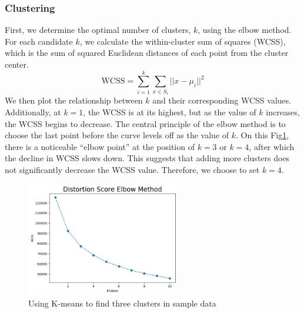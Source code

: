 \documentclass{article}
\begin{document}
\subsubsection{Clustering}
First, we determine the optimal number of clusters, \( k \), using the elbow method. For each candidate \( k \), we calculate the within-cluster sum of squares (WCSS), which is the sum of squared Euclidean distances of each point from the cluster center.
\begin{equation}
\text{WCSS} = \sum_{i=1}^{k} \sum_{x \in S_i} ||x - \mu_i||^2
\end{equation}
We then plot the relationship between \( k \) and their corresponding WCSS values. Additionally, at \( k = 1 \), the WCSS is at its highest, but as the value of \( k \) increases, the WCSS begins to decrease. The central principle of the elbow method is to choose the last point before the curve levels off as the value of \( k \). On this Fig\ref{fig:Elbow methods to find K}, there is a noticeable “elbow point” at the position of \( k = 3 \) or \( k = 4 \), after which the decline in WCSS slows down. This suggests that adding more clusters does not significantly decrease the WCSS value. Therefore, we choose to set \( k = 4 \).
\begin{figure}[hbt!]
    \centering
    \includegraphics[width=0.6\textwidth]{fig/zya/elbow.png}
    \caption{Using K-means to find three clusters in sample data}
    \label{fig:Elbow methods to find K}  %
\end{figure}
\end{document}
